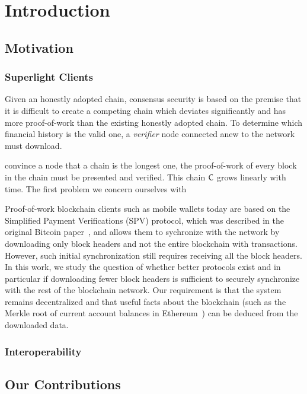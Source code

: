 \chapter{Introduction}\label{chapter:introduction}



\section{Motivation}
\subsection{Superlight Clients}


Given an honestly adopted chain, consensus security is based on the premise that
it is difficult to create a competing chain which deviates significantly and has
more proof-of-work than the existing honestly adopted chain. To determine which
financial history is the valid one, a \emph{verifier} node connected anew to the
network must download.

 convince a node
that a chain is the longest one, the proof-of-work of every block in the chain
must be presented and verified. This chain $\mathsf{C}$ grows linearly with time.
The first problem we concern ourselves with


Proof-of-work blockchain clients such as mobile wallets today are based on the
Simplified Payment Verifications (SPV) protocol, which was described in the
original Bitcoin paper~\cite{bitcoin}, and allows them to sychronize with the
network by downloading only block headers and not the entire blockchain with
transactions. However, such initial synchronization still requires receiving all
the block headers. In this work, we study the question of whether better
protocols exist and in particular if downloading fewer block headers is
sufficient to securely synchronize with the rest of the blockchain network. Our
requirement is that the system remains decentralized and that useful facts about
the blockchain (such as the Merkle root of current account balances in
Ethereum~\cite{wood,buterin}) can be deduced from the downloaded data.

\subsection{Interoperability}
\section{Our Contributions}
